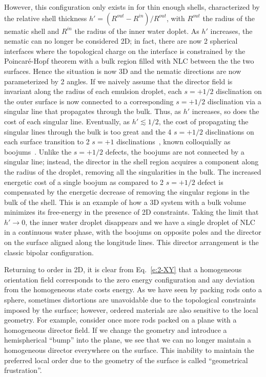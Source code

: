 However, this configuration only exists in for thin enough shells, characterized by the relative shell thickness $h' = (R^{out}-R^{in})/R^{out}$, with $R^{out}$ the radius of the nematic shell and $R^{in}$ the radius of the inner water doplet.
As $h'$ increases, the nematic can no longer be considered 2D; in fact, there are now 2 spherical interfaces where the topological charge on the interface is constrained by the Poincar\'e-Hopf theorem with a bulk region filled with NLC between the the two surfaces.
Hence the situation is now 3D and the nematic directions are now parameterized by 2 angles.
If we naively assume that the director field is invariant along the radius of each emulsion droplet, each $s = +1/2$ disclination on the outer surface is now connected to a corresponding $s = +1/2$ disclination via a singular line that propagates through the bulk.
Thus, as $h'$ increases, so does the cost of each singular line.
Eventually, as $h'\lesssim 1/2$, the cost of propagating the singular lines through the bulk is too great and the 4 $s = +1/2$ disclinations on each surface transition to 2 $s = +1$ disclinations~\cite{RN105}, known colloquially as boojums~\cite{RN273}.
Unlike the $s = +1/2$ defects, the boojums are not connected by a singular line; instead, the director in the shell region acquires a component along the radius of the droplet, removing all the singularities in the bulk.
The increased energetic cost of a single boojum as compared to 2 $s = +1/2$ defect is compensated by the energetic decrease of removing the singular regions in the bulk of the shell.
This is an example of how a 3D system with a bulk volume minimizes its free-energy in the presence of 2D constraints.
Taking the limit that $h' \rightarrow 0$, the inner water droplet disappears and we have a single droplet of NLC in a continuous water phase, with the boojums on opposite poles and the director on the surface aligned along the longitude lines.
This director arrangement is the classic bipolar configuration.

Returning to order in 2D, it is clear from Eq.~\ref{e:2-XY} that a homogeneous orientation field corresponds to the zero energy configuration and any deviation from the homogeneous state costs energy.
As we have seen by packing rods onto a sphere, sometimes distortions are unavoidable due to the topological constraints imposed by the surface; however, ordered materials are also sensitive to the local geometry.
For example, consider once more rods packed on a plane with a homogeneous director field.
If we change the geometry and introduce a hemispherical ``bump'' into the plane, we see that we can no longer maintain a homogeneous director everywhere on the surface.
This inability to maintain the preferred local order due to the geometry of the surface is called ``geometrical frustration''.

